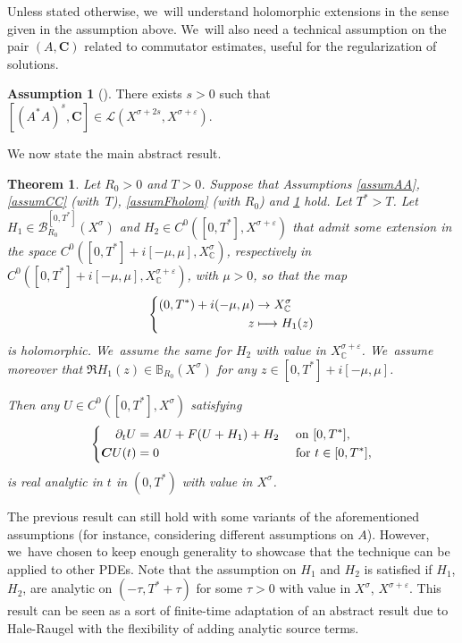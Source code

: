 \documentclass[JEP,XML,SOM,Unicode,published]{cedram}
\newcommand\mto{\mathchoice{\longmapsto}{\mapsto}{\mapsto}{\mapsto}}
\newtheorem{theorem}{Theorem}[section]
\theoremstyle{definition}
\newtheorem{assum}{Assumption}
\newenvironment{assump}[2][]
{\renewcommand\theassum{#2}\begin{assum}[#1]}
{\end{assum}}
\let\mc\mathcal
\let\veps\varepsilon
\newcommand{\B}{\mc{B}}
\newcommand{\bC}{\boldsymbol{C}}
\begin{document}
Unless stated otherwise, we~will understand holomorphic extensions in the sense given in the assumption above. We~will also need a technical assumption on the pair $(A, \bC)$ related to commutator estimates, useful for the regularization of solutions.
\begin{assump}{4}
\label{assumcommu}
There exists $s>0$ such that $[(A^*A)^s,\bC]\in \mc{L}(X^{\sigma+2s}, X^{\sigma+\veps})$.
\end{assump}

We now state the main abstract result.

\begin{theorem}\label{thmabstractanalyticintro}
Let $R_{0}\!>\!0$ and $T\!>\!0$. Suppose that Assumptions \ref{assumAA}, \ref{assumCC} (with~$T$), \ref{assumFholom} (with $R_{0}$) and \ref{assumcommu} hold. Let $T^{*}\!>\!T$. Let $H_{1}\in \B_{R_{0}}^{[0,T^{*}]}(X^{\sigma})$ and $H_{2}\in C^{0}([0,T^{*}],X^{\sigma+\veps})$ that admit some extension in the space $C^{0}([0,T^{*}]+i[-\mu,\mu],X^{\sigma}_{\mathbb{C}})$, respectively in \hbox{$C^{0}([0,T^{*}]+i[-\mu,\mu],X^{\sigma+\veps}_{\mathbb{C}})$}, with $\mu\!>\!0$, so that the map
\begin{align*}
\left\{\begin{aligned}
(0,T^{*})+i(-\mu,\mu) & \to X^{\sigma}_{\mathbb{C}}\\
z&\mto H_{1}(z)
\end{aligned}\right.
\end{align*}
is holomorphic. We~assume the same for $H_{2}$ with value in $X^{\sigma+\veps}_{\mathbb{C}}$. We~assume moreover that $\Re H_{1}(z)\in \mathbb{B}_{R_0}(X^{\sigma})$ for any $z\in [0,T^{*}]+i[-\mu,\mu]$.

Then any $U\in C^{0}([0,T^{*}],X^{\sigma})$ satisfying
\begin{align}\label{UCabstractT*intro}
\left\{\begin{aligned}
\partial_t U&=AU+F(U+H_{1})+H_{2}&& \textnormal{ on } [0,T^{*}], \\
\bC U(t)&=0 &&\textnormal{ for }t\in [0,T^{*}],
\end{aligned}\right.
\end{align}
is real analytic in $t$ in $(0,T^*)$ with value in $X^{\sigma}$.
\end{theorem}

The previous result can still hold with some variants of the aforementioned assumptions (for instance, considering different assumptions on $A$). However, we~have chosen to keep enough generality to showcase that the technique can be applied to other PDEs. Note that the assumption on $H_1$ and $H_2$ is satisfied if $H_1$, \resp $H_2$, are analytic on $(-\tau,T^*+\tau)$ for some $\tau>0$ with value in $X^{\sigma}$, \resp $X^{\sigma+\veps}$. This result can be seen as a sort of finite-time adaptation of an abstract result due to Hale-Raugel \cite[Th.\,2.5]{HR03} with the flexibility of adding analytic source terms.
\end{document}
